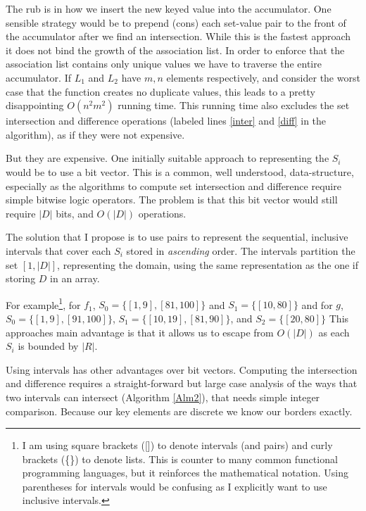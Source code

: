 \documentclass{article}
\begin{document}
The rub is in how we insert the new keyed value into the accumulator.
One sensible strategy would be to prepend (cons) each set-value pair to the
front of the accumulator after we find an intersection.
While this is the fastest approach it does not bind the growth of the
association list.
In order to enforce that the association list contains only unique values
we have to traverse the entire accumulator.
If $L_{1}$ and $L_{2}$ have $m, n$ elements respectively,
and consider the worst case that the function creates no duplicate values,
this leads to a pretty disappointing $O(n^{2}m^{2})$ running time.
This running time also excludes the set intersection and difference
operations (labeled lines \ref{inter} and \ref{diff} in the algorithm),
as if they were not expensive.

But they are expensive.
One initially suitable approach to representing the $S_{i}$ would be
to use a bit vector.
This is a common, well understood, data-structure,
especially as the algorithms to compute set intersection and difference require
simple bitwise logic operators.
The problem is that this bit vector would still require $|D|$ bits,
and $O(|D|)$ operations.

The solution that I propose is to use pairs to represent the sequential,
inclusive intervals that cover each $S_{i}$ stored in \emph{ascending} order.
The intervals partition the set $[1,|D|]$,
representing the domain,
using the same representation as the one if storing $D$ in an array.

For example\footnote{I am using square brackets ([]) to denote
intervals (and pairs) and curly brackets (\{\}) to denote lists.
This is counter to many common functional programming languages,
but it reinforces the mathematical notation.
Using parentheses for intervals would be confusing as I explicitly want to
use inclusive intervals.},
for $f_{1}$, $S_{0} = \{[1,9],[81,100]\}$ and $S_{1} = \{[10,80]\}$
and for $g$, $S_{0} = \{[1,9], [91,100]\}$,
$S_{1} = \{ [10,19], [81,90]\}$,
and $S_{2} = \{[20,80] \}$
This approaches main advantage is that it allows us to escape from $O(|D|)$
as each $S_{i}$ is bounded by $|R|$.

Using intervals has other advantages over bit vectors.
Computing the intersection and difference requires a straight-forward
but large case analysis of the ways that two intervals can
intersect (Algorithm \ref{Alm2}),
that needs simple integer comparison.
Because our key elements are discrete we know our borders exactly.
\end{document}
